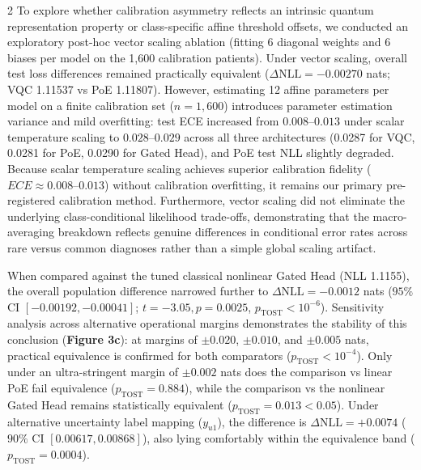 \documentclass[10pt,a4paper,twoside]{article}
\begin{document}
\begin{multicols}{2}
To explore whether calibration asymmetry reflects an intrinsic quantum representation property or class-specific affine threshold offsets, we conducted an exploratory post-hoc vector scaling ablation (fitting 6 diagonal weights and 6 biases per model on the 1,600 calibration patients). Under vector scaling, overall test loss differences remained practically equivalent ($\Delta\text{NLL} = -0.00270$ nats; VQC 1.11537 vs PoE 1.11807). However, estimating 12 affine parameters per model on a finite calibration set ($n=1,600$) introduces parameter estimation variance and mild overfitting: test ECE increased from $0.008\text{--}0.013$ under scalar temperature scaling to $0.028\text{--}0.029$ across all three architectures (0.0287 for VQC, 0.0281 for PoE, 0.0290 for Gated Head), and PoE test NLL slightly degraded. Because scalar temperature scaling achieves superior calibration fidelity ($ECE \approx 0.008\text{--}0.013$) without calibration overfitting, it remains our primary pre-registered calibration method. Furthermore, vector scaling did not eliminate the underlying class-conditional likelihood trade-offs, demonstrating that the macro-averaging breakdown reflects genuine differences in conditional error rates across rare versus common diagnoses rather than a simple global scaling artifact.

When compared against the tuned classical nonlinear Gated Head (NLL 1.1155), the overall population difference narrowed further to $\Delta\text{NLL} = \mathbf{-0.0012}$ nats ($95\%$ CI $[-0.00192, -0.00041]$; $t = -3.05, p = 0.0025$, $p_{\text{TOST}} < 10^{-6}$). Sensitivity analysis across alternative operational margins demonstrates the stability of this conclusion (\textbf{Figure 3c}): at margins of $\pm 0.020$, $\pm 0.010$, and $\pm 0.005$ nats, practical equivalence is confirmed for both comparators ($p_{\text{TOST}} < 10^{-4}$). Only under an ultra-stringent margin of $\pm 0.002$ nats does the comparison vs linear PoE fail equivalence ($p_{\text{TOST}} = 0.884$), while the comparison vs the nonlinear Gated Head remains statistically equivalent ($p_{\text{TOST}} = 0.013 < 0.05$). Under alternative uncertainty label mapping ($y_{u1}$), the difference is $\Delta\text{NLL} = +0.0074$ ($90\%$ CI $[0.00617, 0.00868]$), also lying comfortably within the equivalence band ($p_{\text{TOST}} = 0.0004$).

\end{multicols}
\end{document}
